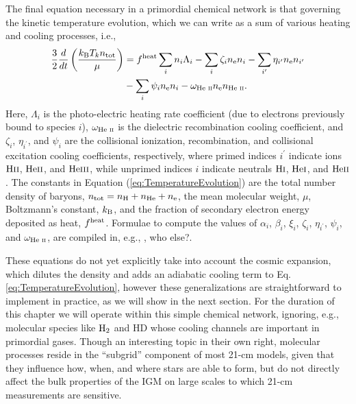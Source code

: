 The final equation necessary in a primordial chemical network is that governing the kinetic temperature evolution, which we can write as a sum of various heating and cooling processes, i.e.,
\begin{align}
    \frac{3}{2}\frac{d}{dt}\left(\frac{k_{\text{B}} T_k n_{\text{tot}}}{\mu}\right) & = f^{\text{heat}}  \sum_i n_i \Lambda_i - \sum_i \zeta_i n_{\text{e}} n_i - \sum_{i^{\prime}} \eta_{i^{\prime}} n_{\text{e}} n_{i^{\prime}} \nonumber \\ & - \sum_i \psi_i n_{\text{e}} n_i - \omega_{\text{He } \textsc{ii}} n_{\text{e}} n_{\text{He } \textsc{ii}} \label{eq:TemperatureEvolution} .
\end{align}
Here, $\Lambda_i$ is the photo-electric heating rate coefficient (due to
electrons previously bound to species $i$), $\omega_{\text{He } \textsc{ii}}$ is the dielectric
recombination cooling coefficient, and $\zeta_i$, $\eta_{i^{\prime}}$, and
$\psi_i$ are the collisional ionization, recombination, and collisional
excitation cooling coefficients, respectively, where primed indices
$i^{\prime}$ indicate ions $\text{H} {\textsc{ii}}$, $\text{He} {\textsc{ii}}$, and $\text{He} {\textsc{iii}}$, while unprimed
indices $i$ indicate neutrals $\text{H} {\textsc{i}}$, $\text{He} {\textsc{i}}$, and $\text{He} {\textsc{ii}}$. The constants in
Equation (\ref{eq:TemperatureEvolution}) are the total number density of
baryons, $n_{\text{tot}} = n_\mathrm{H} + n_{\mathrm{He}} + n_{\text{e}}$, the mean molecular
weight, $\mu$, Boltzmann's constant, $k_{\text{B}}$, and the fraction of secondary
electron energy deposited as heat, $f^{\text{heat}}$. Formulae to compute the values of
$\alpha_i$, $\beta_i$, $\xi_i$, $\zeta_i$, $\eta_{i^{\prime}}$, $\psi_i$, and
$\omega_{\text{He } \textsc{ii}}$, are compiled in, e.g., \cite{Fukugita1994}, {\color{red} who
else?}.

These equations do not yet explicitly take into account the cosmic expansion, which dilutes the density and adds an adiabatic cooling term to Eq. \ref{eq:TemperatureEvolution}, however these generalizations are straightforward to implement in practice, as we will show in the next section. For the duration of this chapter we will operate within this simple chemical network, ignoring, e.g., molecular species like $\text{H}_2$ and $\mathrm{HD}$ whose cooling channels are important in primordial gases. Though an interesting topic in their own right, molecular processes reside in the ``subgrid'' component of most 21-cm models, given that they influence how, when, and where stars are able to form, but do not directly affect the bulk properties of the IGM on large scales to which 21-cm measurements are sensitive.

